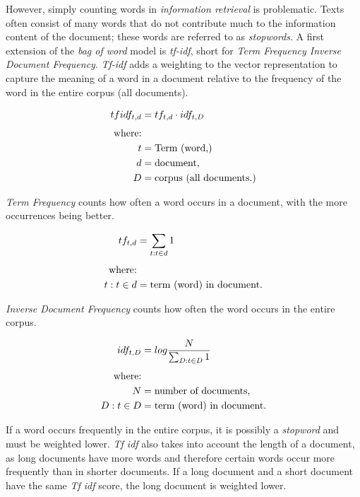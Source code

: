 \documentclass{article}
\begin{document}
However, simply counting words in \textit{information retrieval} is problematic. Texts often consist of many words that do not contribute much to the information content of the document; these words are referred to as \textit{stopwords}. A first extension of the \textit{bag of word} model is \textit{tf-idf}, short for \textit{Term Frequency Inverse Document Frequency}. \textit{Tf-idf} adds a weighting to the vector representation to capture the meaning of a word in a document relative to the frequency of the word in the entire corpus (all documents). 

\begin{align}
\begin{split}
	tfidf_{t,d} &= tf_{t,d} \cdot idf_{t,D}\\[0.25\baselineskip]
	\text{where:}\\ 
    t &= \text{Term (word,)}\\
	d &= \text{document,}\\ 
	D &= \text{corpus (all documents.)}
\end{split}
\end{align}


\textit{Term Frequency} counts how often a word occurs in a document, with the more occurrences being better.

\begin{align}
\begin{split}
	tf_{t,d} &= \sum_{t: t \in d}1\\[0.25\baselineskip]
	\text{where:}\\
	t: t \in d &= \text{term (word) in document.}\\ 
\end{split}
\end{align}

\textit{Inverse Document Frequency} counts how often the word occurs in the entire corpus. 

\begin{align}
\begin{split}
	idf_{t,D} &= log\frac{N}{\sum_{D: t \in D} 1}\\[0.25\baselineskip]
	\text{where:}\\
	N &= \text{number of documents,}\\ 
	D: t \in D &= \text{term (word) in document.}
\end{split}
\end{align}

If a word occurs frequently in the entire corpus, it is possibly a \textit{stopword} and must be weighted lower. \textit{Tf idf} also takes into account the length of a document, as long documents have more words and therefore certain words occur more frequently than in shorter documents. If a long document and a short document have the same \textit{Tf idf} score, the long document is weighted lower.
\end{document}
